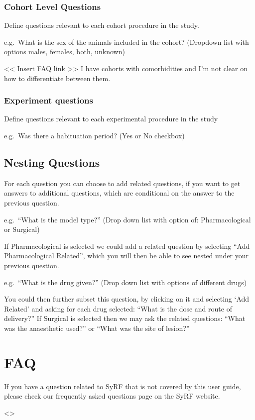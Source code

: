 \documentclass[
]{book}
\begin{document}
\hypertarget{cohort-level-questions}{%
\subsection{Cohort Level Questions}\label{cohort-level-questions}}

Define questions relevant to each cohort procedure in the study.

e.g.~What is the sex of the animals included in the cohort?
(Dropdown list with options males, females, both, unknown)

\textless{}\textless{} Insert FAQ link \textgreater{}\textgreater{}
I have cohorts with comorbidities and I'm not clear on how to differentiate between them.

\hypertarget{experiment-questions}{%
\subsection{Experiment questions}\label{experiment-questions}}

Define questions relevant to each experimental procedure in the study

e.g.~Was there a habituation period?
(Yes or No checkbox)

\hypertarget{nesting-questions}{%
\section{Nesting Questions}\label{nesting-questions}}

For each question you can choose to add related questions, if you want to get answers to additional questions, which are conditional on the answer to the previous question.

e.g.~``What is the model type?''
(Drop down list with option of: Pharmacological or Surgical)

If Pharmacological is selected we could add a related question by selecting ``Add Pharmacological Related'', which you will then be able to see nested under your previous question.

e.g.~``What is the drug given?''
(Drop down list with options of different drugs)

You could then further subset this question, by clicking on it and selecting `Add Related' and asking for each drug selected: ``What is the dose and route of delivery?''
If Surgical is selected then we may ask the related questions: ``What was the anaesthetic used?'' or ``What was the site of lesion?''

\hypertarget{faq}{%
\chapter{FAQ}\label{faq}}

If you have a question related to SyRF that is not covered by this user guide, please check our frequently asked questions page on the SyRF website.

\textless{}\textgreater{}

  
\end{document}
